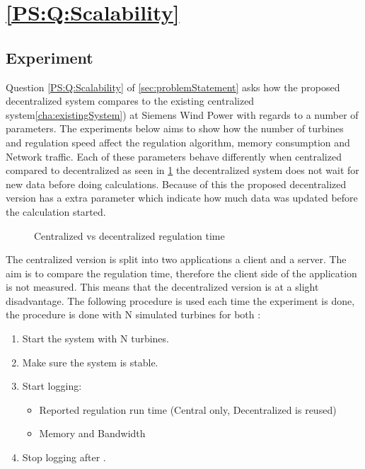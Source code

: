 \section{\ref{PS:Q:Scalability}}



\subsection{Experiment}
\label{subsec:Exper:Scale}
Question \ref{PS:Q:Scalability} of \cref{sec:problemStatement} asks how the proposed decentralized system compares to the existing centralized system\cref{cha:existingSystem}) at Siemens Wind Power with regards to a number of parameters.
The experiments below aims to show how the number of turbines and regulation speed affect the regulation algorithm, memory consumption and Network traffic.
Each of these parameters behave differently when centralized compared to decentralized as seen in \cref{fig:timingCentralVSDecentral} the decentralized system does not wait for new data before doing calculations. Because of this the proposed decentralized version has a extra parameter which indicate how much data was updated before the calculation started.

\begin{figure}[b]
	\centering
	{}
	\newline
	
	\newline
	
	{}
	
	\caption{Centralized vs decentralized regulation time}
	\label{fig:timingCentralVSDecentral}
\end{figure}

	The centralized version is split into two applications a client and a server.
	The aim is to compare the regulation time, therefore the client side of the application is not measured. This means that the decentralized version is at a slight disadvantage.
	The following procedure is used each time the experiment is done, the procedure is done with N simulated turbines for both :

\begin{minipage}{\textwidth}
	\begin{enumerate}
		\item Start the system with N turbines.
		\item Make sure the system is stable.
		\item Start logging:
		\begin{itemize}
			\item Reported regulation run time (Central only, Decentralized is reused)
			\item Memory and Bandwidth
		\end{itemize}
		\item Stop logging after \experiemntRunTime.
		\end{enumerate}
\end{minipage}


